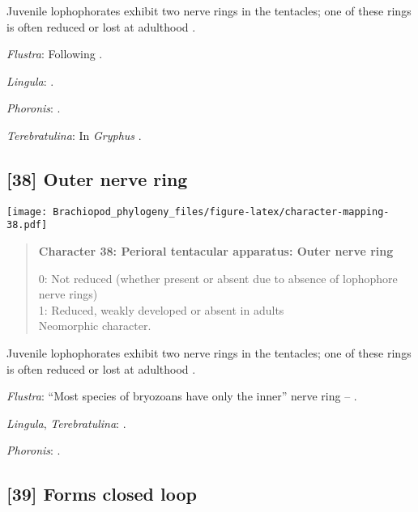 \documentclass[openany]{book}
\theoremstyle{definition}
\theoremstyle{definition}
\theoremstyle{definition}
\theoremstyle{remark}
\begin{document}
Juvenile lophophorates exhibit two nerve rings in the tentacles; one of
these rings is often reduced or lost at adulthood
\citep{Temereva2017Innervationof}.

\hypertarget{Flustra-coding-37}{}
\emph{Flustra}: Following \citet{Temereva2017Innervationof}.

\hypertarget{Lingula-coding-37}{}
\emph{Lingula}: \citet{Temereva2017Thefirst}.

\hypertarget{Phoronis-coding-37}{}
\emph{Phoronis}: \citep{Temereva2017Innervationof}.

\hypertarget{Terebratulina-coding-37}{}
\emph{Terebratulina}: In \emph{Gryphus} \citep{Temereva2017Thefirst}.

\subsection*{{[}38{]} Outer nerve ring}\label{outer-nerve-ring}

\texttt{[image: Brachiopod\_phylogeny\_files/figure-latex/character-mapping-38.pdf]}

\begin{quote}
\textbf{Character 38: Perioral tentacular apparatus: Outer nerve ring}

0: Not reduced (whether present or absent due to absence of lophophore
nerve rings)\\
1: Reduced, weakly developed or absent in adults\\
Neomorphic character.
\end{quote}

Juvenile lophophorates exhibit two nerve rings in the tentacles; one of
these rings is often reduced or lost at adulthood
\citep{Temereva2017Innervationof}.

\hypertarget{Flustra-coding-38}{}
\emph{Flustra}: ``Most species of bryozoans have only the inner'' nerve
ring -- \citet{Temereva2017Innervationof}.

\hypertarget{Lingula-coding-38}{}
\emph{Lingula}, \emph{Terebratulina}: \citet{Temereva2017Innervationof}.

\hypertarget{Phoronis-coding-38}{}
\emph{Phoronis}: \citet{Temereva2017Thefirst}.

\subsection*{{[}39{]} Forms closed loop}\label{forms-closed-loop}
\end{document}
